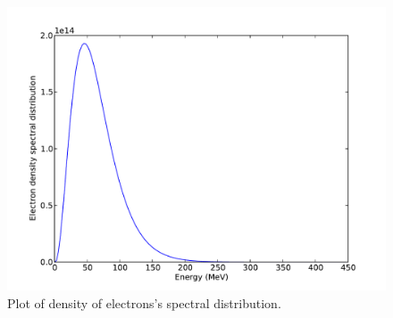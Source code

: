 \documentclass[10pt]{article}
\begin{document}
\begin{figure}[hbt]
  \begin{center}
    \includegraphics[scale=0.7]{Plot/plot2.pdf}
    \caption{\label{fig:SpeDis} Plot of density of electrons's spectral distribution.}
  \end{center}
\end{figure}
\end{document}
